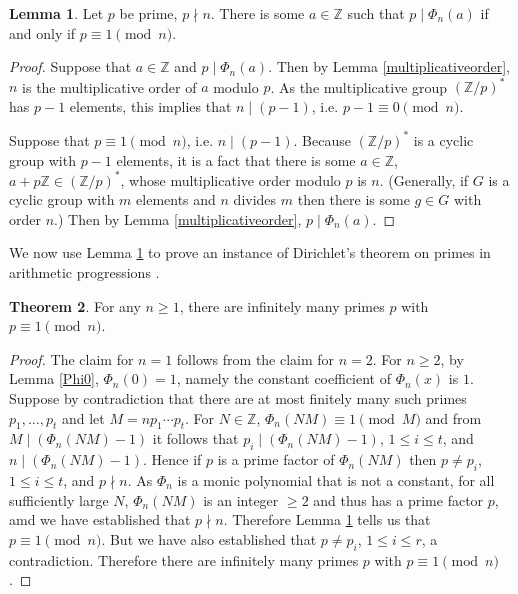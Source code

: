 \documentclass{article}
\theoremstyle{definition}
\newtheorem{theorem}{Theorem}
\newtheorem{lemma}[theorem]{Lemma}
\theoremstyle{definition}
\begin{document}
\begin{lemma}
Let $p$ be prime, $p \nmid n$. There is some $a \in \mathbb{Z}$ such that $p \mid \Phi_n(a)$ if and only if
$p \equiv 1 \pmod{n}$. 
\label{aPhi}
\end{lemma}
\begin{proof}
Suppose that $a \in \mathbb{Z}$ and $p \mid \Phi_n(a)$. Then by Lemma \ref{multiplicativeorder},
$n$ is the multiplicative order of $a$ modulo $p$. As the multiplicative group
$(\mathbb{Z}/p)^*$ has $p-1$ elements, this implies that $n \mid (p-1)$, i.e. $p-1 \equiv 0 \pmod{n}$.

Suppose that $p \equiv 1 \pmod{n}$, i.e. $n \mid (p-1)$. 
Because $(\mathbb{Z}/p)^*$ is a cyclic group with $p-1$ elements, it is a fact that 
there is some $a \in \mathbb{Z}$, $a+p\mathbb{Z} \in (\mathbb{Z}/p)^*$, whose multiplicative order modulo
$p$ is $n$. (Generally, if $G$ is a cyclic group with $m$ elements and $n$ divides $m$ then there is some
$g \in G$ with order $n$.) Then by Lemma \ref{multiplicativeorder}, $p \mid \Phi_n(a)$.
\end{proof}


We now use Lemma \ref{aPhi} to prove an instance of Dirichlet's theorem on primes in arithmetic progressions \cite[p.~13, Lemma 2.9]{washington}.


\begin{theorem}
For any $n \geq 1$, there are infinitely many primes $p$ with $p \equiv 1 \pmod{n}$.
\end{theorem}
\begin{proof}
The claim for $n=1$ follows from the claim for $n=2$. 
For $n \geq 2$, by Lemma \ref{Phi0}, $\Phi_n(0)=1$, namely the constant coefficient of $\Phi_n(x)$ is $1$. 
Suppose by contradiction that there are at most finitely many such primes $p_1,\ldots,p_t$
and let $M = np_1\cdots p_t$. For $N \in \mathbb{Z}$, $\Phi_n(NM) \equiv 1 \pmod{M}$ and
from $M \mid (\Phi_n(NM) - 1)$ it follows that $p_i \mid (\Phi_n(NM)-1)$, $1 \leq i \leq t$, and
$n \mid (\Phi_n(NM)-1)$. Hence if $p$ is a prime factor
of $\Phi_n(NM)$ then $p \neq p_i$, $1 \leq i \leq t$, and $p \nmid n$.
As $\Phi_n$ is a  monic polynomial that is not a constant,
for all sufficiently large $N$, $\Phi_n(NM)$ is an integer $\geq 2$ and thus has a prime factor $p$, amd we have
 established that $p \nmid n$. Therefore
Lemma \ref{aPhi} tells us that $p \equiv 1 \pmod{n}$. 
But we have also established that $p \neq p_i$, $1 \leq i \leq r$, a contradiction. Therefore
there are infinitely many primes $p$ with $p \equiv 1 \pmod{n}$.
\end{proof}
\end{document}

